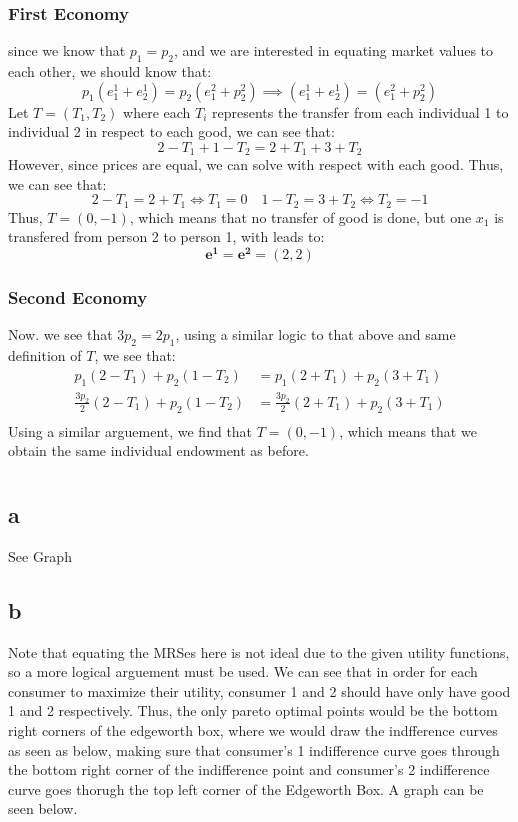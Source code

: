 \documentclass[11pt]{article}
\begin{document}
\subsubsection*{First Economy}
since we know that $p_1 = p_2$, and we are interested in equating market values to each other, we should know that:
\[
p_1(e_1^1 + e_2^1) = p_2(e_1^2 + p_2^2) \implies (e_1^1 + e_2^1) = (e_1^2 + p_2^2)
\]
Let $T = (T_1, T_2)$ where each $T_i$ represents the transfer from each individual 1 to individual 2 in respect to each good, we can see that:
\[
2 - T_1 + 1 - T_2 = 2 + T_1 + 3 + T_2 
\]
However, since prices are equal, we can solve with respect with each good. Thus, we can see that:
\[
2 - T_1 = 2 + T_1 \iff T_1 = 0 \quad 1 - T_2 = 3 + T_2 \iff T_2 = -1
\]
Thus, $T = (0, -1)$, which means that no transfer of good is done, but one $x_1$ is transfered from person 2 to person 1, with leads to:
\[
\mathbf{e^1} = \mathbf{e^2}= (2, 2)
\]
\subsubsection*{Second Economy}
Now. we see that $3p_2 = 2p_1$, using a similar logic to that above and same definition of $T$, we see that:
\begin{align*}
    p_1(2-T_1) + p_2(1-T_2) &= p_1(2+T_1) + p_2(3 + T_1)\\
    \frac{3p_2}{2}(2 - T_1) + p_2(1 - T_2) &= \frac{3p_2}{2}(2+T_1) + p_2(3+T_1)\\
\end{align*}
Using a similar arguement, we find that $T = (0, -1)$, which means that we obtain the same individual endowment as before.

\section{}
\subsection*{a}
See Graph
\subsection*{b}
Note that equating the MRSes here is not ideal due to the given utility functions, so a more logical arguement must be used. We can see that in order for each consumer to maximize their utility, consumer 1 and 2 should have only have good 1 and 2 respectively. Thus, the only pareto optimal points would be the bottom right corners of the edgeworth box, where we would draw the indfference curves as seen as below, making sure that consumer's 1 indifference curve goes through the bottom right corner of the indifference point and consumer's 2 indifference curve goes thorugh the top left corner of the Edgeworth Box. A graph can be seen below. 
\end{document}
